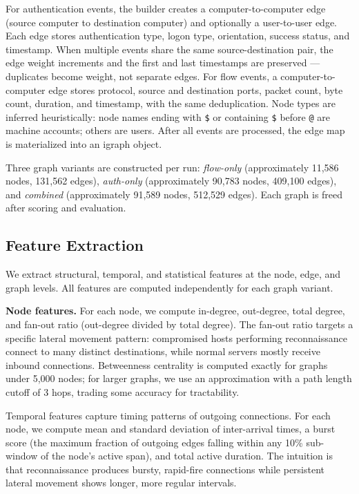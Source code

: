 For authentication events, the builder creates a computer-to-computer edge (source computer to destination computer) and optionally a user-to-user edge. Each edge stores authentication type, logon type, orientation, success status, and timestamp. When multiple events share the same source-destination pair, the edge weight increments and the first and last timestamps are preserved --- duplicates become weight, not separate edges. For flow events, a computer-to-computer edge stores protocol, source and destination ports, packet count, byte count, duration, and timestamp, with the same deduplication. Node types are inferred heuristically: node names ending with \texttt{\$} or containing \texttt{\$} before \texttt{@} are machine accounts; others are users. After all events are processed, the edge map is materialized into an igraph object.

Three graph variants are constructed per run: \emph{flow-only} (approximately 11,586 nodes, 131,562 edges), \emph{auth-only} (approximately 90,783 nodes, 409,100 edges), and \emph{combined} (approximately 91,589 nodes, 512,529 edges). Each graph is freed after scoring and evaluation.

\subsection{Feature Extraction}

We extract structural, temporal, and statistical features at the node, edge, and graph levels. All features are computed independently for each graph variant.

\textbf{Node features.}
For each node, we compute in-degree, out-degree, total degree, and fan-out ratio (out-degree divided by total degree). The fan-out ratio targets a specific lateral movement pattern: compromised hosts performing reconnaissance connect to many distinct destinations, while normal servers mostly receive inbound connections. Betweenness centrality is computed exactly for graphs under 5,000 nodes; for larger graphs, we use an approximation with a path length cutoff of 3 hops, trading some accuracy for tractability.

Temporal features capture timing patterns of outgoing connections. For each node, we compute mean and standard deviation of inter-arrival times, a burst score (the maximum fraction of outgoing edges falling within any 10\% sub-window of the node's active span), and total active duration. The intuition is that reconnaissance produces bursty, rapid-fire connections while persistent lateral movement shows longer, more regular intervals.

